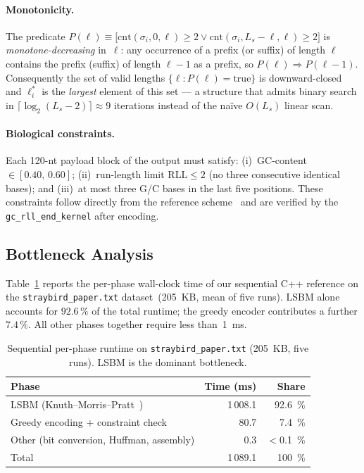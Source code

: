 \documentclass[runningheads]{llncs}
\begin{document}
\paragraph{Monotonicity.}
The predicate $P(\ell) \equiv \bigl[\mathrm{cnt}(\sigma_i, 0, \ell)
\geq 2 \lor \mathrm{cnt}(\sigma_i, L_s{-}\ell, \ell) \geq 2\bigr]$
is \emph{monotone-decreasing} in~$\ell$: any occurrence of a prefix
(or suffix) of length $\ell$ contains the prefix (suffix) of length
$\ell - 1$ as a prefix, so $P(\ell) \Rightarrow P(\ell-1)$.
Consequently the set of valid lengths $\{\ell : P(\ell) = \mathrm{true}\}$
is downward-closed and $\ell^*_i$ is the \emph{largest} element of
this set --- a structure that admits binary search in
$\lceil \log_2(L_s - 2) \rceil \approx 9$ iterations instead of the
na\"ive $O(L_s)$ linear scan.

\paragraph{Biological constraints.}
Each 120-nt payload block of the output must satisfy:
(i)~GC-content $\in [0.40,\, 0.60]$;
(ii)~run-length limit $\mathrm{RLL} \leq 2$ (no three consecutive
identical bases); and
(iii)~at most three G/C bases in the last five positions.
These constraints follow directly from the reference
scheme~\cite{ref_rste} and are verified by the
\texttt{gc\_rll\_end\_kernel} after encoding.

\subsection{Bottleneck Analysis}
\label{sec:bottleneck}

Table~\ref{tab:bottleneck} reports the per-phase wall-clock time of our
sequential C++ reference on the \texttt{straybird\_paper.txt}
dataset~(205~KB, mean of five runs).  LSBM alone accounts for
$92.6\,\%$ of the total runtime; the greedy encoder contributes a
further $7.4\,\%$.  All other phases together require less than~1~ms.

\begin{table}[t]
\caption{Sequential per-phase runtime on \texttt{straybird\_paper.txt}
(205~KB, five runs).  LSBM is the dominant bottleneck.}
\label{tab:bottleneck}
\centering\small
\begin{tabular}{lrr}
\toprule
Phase & Time (ms) & Share \\
\midrule
LSBM (Knuth--Morris--Pratt~\cite{ref_kmp1977})        & 1\,008.1 & 92.6~\% \\
Greedy encoding + constraint check                     &   80.7   &  7.4~\% \\
Other (bit conversion, Huffman, assembly)              &    0.3   & $<$0.1~\% \\
\midrule
Total                                                  & 1\,089.1 & 100~\% \\
\bottomrule
\end{tabular}
\end{table}
\end{document}
